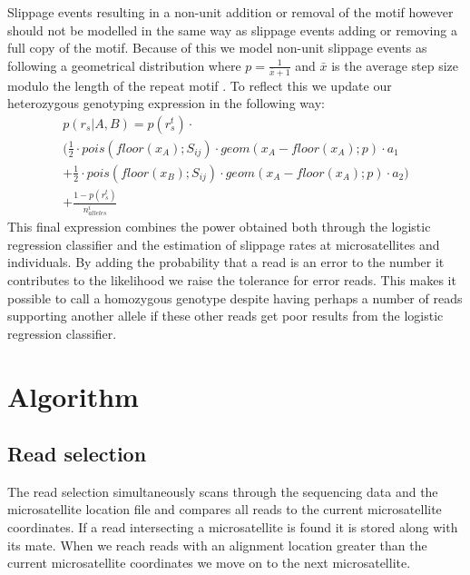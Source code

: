 \documentclass{bioinfo}
\begin{document}
\begin{methods}
Slippage events resulting in a non-unit addition or removal of the motif however should not be modelled in the same way as slippage events adding or removing a full copy of the motif. Because of this we model non-unit slippage events as following a geometrical distribution where $p = \frac{1}{\bar{x}+1}$ and $\bar{x}$ is the average step size modulo the length of the repeat motif \cite{Gymrek2012}.
To reflect this we update our heterozygous genotyping expression in the following way:
\begin{multline}
    p(r_s|A,B) = p(r^t_s) \cdot \\
    \biggl(\frac{1}{2} \cdot pois(floor(x_A);S_{ij}) \cdot geom(x_A-floor(x_A);p) \cdot a_1 \\ + \frac{1}{2} \cdot pois(floor(x_B);S_{ij})\cdot geom(x_A-floor(x_A);p) \cdot a_2 \biggr) \\
    + \frac{1-p(r^t_s)}{n^i_{alleles}}
    \label{eq:likelihood4}
\end{multline}
This final expression combines the power obtained both through the logistic regression classifier and the estimation of slippage rates at microsatellites and individuals. By adding the probability that a read is an error to the number it contributes to the likelihood we raise the tolerance for error reads. This makes it possible to call a homozygous genotype despite having perhaps a number of reads supporting another allele if these other reads get poor results from the logistic regression classifier.
\end{methods}
\section{Algorithm}
\subsection{Read selection}
    The read selection simultaneously scans through the sequencing data and the microsatellite location file and compares all reads to the current microsatellite coordinates. If a read intersecting a microsatellite is found it is stored along with its mate. When we reach reads with an alignment location greater than the current microsatellite coordinates we move on to the next microsatellite.
\end{document}

